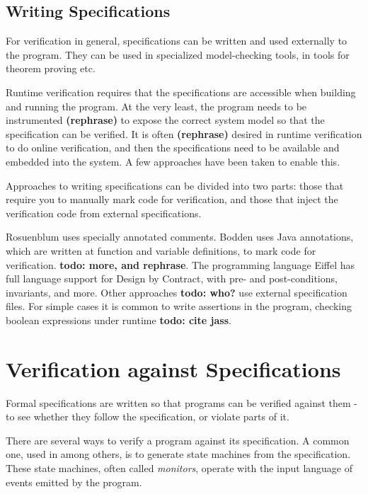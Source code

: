 \documentclass[a4paper,11pt]{kth-mag}
\newcommand{\todo}[1]{\textbf{todo: #1}}
\newcommand{\rephrase}{\textbf{(rephrase)} }
\begin{document}
\subsection{Writing Specifications}

For verification in general, specifications can be written and used externally
to the program. They can be used in specialized model-checking tools, in tools
for theorem proving etc.

Runtime verification requires that the specifications are accessible when
building and running the program. At the very least, the program needs to be
instrumented \rephrase to expose the correct system model so that the
specification can be verified. It is often \rephrase desired in runtime
verification to do online verification, and then the specifications need to be
available and embedded into the system. A few approaches have been taken to
enable this.

Approaches to writing specifications can be divided into two parts: those that
require you to manually mark code for verification, and those that inject the
verification code from external specifications.

Rosuenblum \cite{rosenblum95practicalassertions} uses specially annotated
comments. Bodden \cite{bodden05efficientrv} uses Java annotations, which are
written at function and variable definitions, to mark code for verification.
\todo{more, and rephrase}. The programming language Eiffel has full language
support for Design by Contract, with pre- and post-conditions, invariants, and
more. Other approaches \todo{who?} use external specification files. For simple
cases it is common to write assertions in the program, checking boolean
expressions under runtime \todo{cite jass}.


\section{Verification against Specifications} \label{section-verification}

Formal specifications are written so that programs can be verified against them
- to see whether they follow the specification, or violate parts of it.

There are several ways to verify a program against its specification. A common
one, used in \cite{bauer06monitoring,bodden05efficientrv} among others, is to
generate state machines from the specification. These state machines, often
called \textit{monitors}, operate with the input language of events emitted by
the program.
\end{document}
